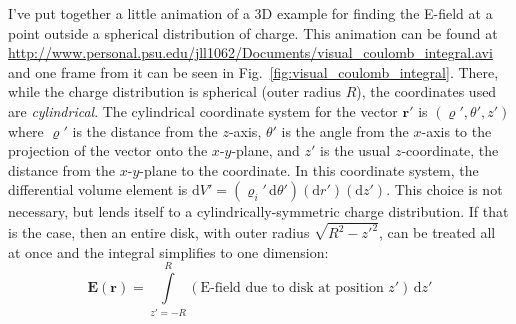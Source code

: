 \documentclass[10pt,letterpaper,twoside]{article}
\begin{document}
I've put together a little animation of a 3D example for finding the E-field at a point outside a spherical distribution of charge.
This animation can be found at \url{http://www.personal.psu.edu/jll1062/Documents/visual_coulomb_integral.avi} and one frame from it can be seen in Fig.~\ref{fig:visual_coulomb_integral}.
There, while the charge distribution is spherical (outer radius $R$), the coordinates used are \textit{cylindrical}.
The cylindrical coordinate system for the vector $\bm r'$ is $(\varrho',\theta',z')$ where $\varrho'$ is the distance from the $z$-axis, $\theta'$ is the angle from the $x$-axis to the projection of the vector onto the $x$-$y$-plane, and $z'$ is the usual $z$-coordinate, the distance from the $x$-$y$-plane to the coordinate.
In this coordinate system, the differential volume element is $\mathrm d V'=(\varrho_i'\,\mathrm d\theta')(\mathrm d r')(\mathrm d z')$.
This choice is not necessary, but lends itself to a cylindrically-symmetric charge distribution.
If that is the case, then an entire disk, with outer radius $\sqrt{R^2-z'^2}$, can be treated all at once and the integral simplifies to one dimension:
$$ \bm E(\bm r) = \int\limits_{z'=-R}^{R} \left(\text{E-field due to disk at position }z'\right) \,\mathrm d z' $$
\end{document}
